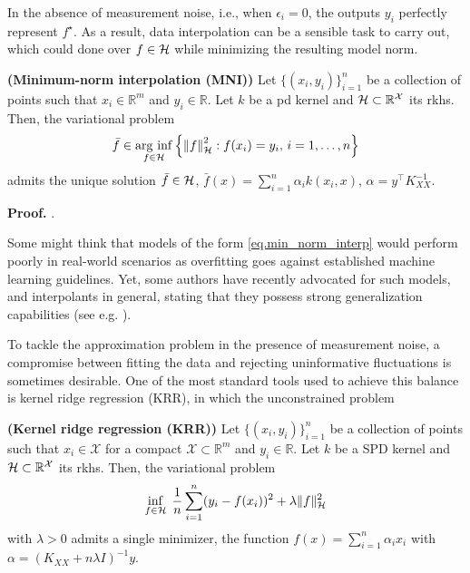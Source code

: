 In the absence of measurement noise, i.e., when $\epsilon_i = 0$, the outputs $y_i$ perfectly represent $f^\star$. As a result, data interpolation can be a sensible task to carry out, which could done over $f \in \mathcal{H}$ while minimizing the resulting model norm.
\begin{proposition}
	\label{prop.MNI}
	\textbf{(Minimum-norm interpolation (MNI))}
	Let $\{(x_i,y_i)\}_{i=1}^n$ be a collection of points such that $x_i \in \mathbb{R}^m$ and $y_i \in \mathbb{R}$. Let $k$ be a \ac{pd} kernel and $\mathcal{H} \subset \mathbb{R}^\mathcal{X}$ its \ac{rkhs}. Then, the variational problem
	\begin{equation}
		\label{eq.min_norm_interp}
			\bar{f} \in \operatorname*{\arg\,\inf}_{f \in \mathcal{H}} \left\{ \left\| f \right\|_\mathcal{H}^2 : f(x_i) = y_i, \, i = 1,\dots,n \right\}
	\end{equation}
	admits the unique solution $\bar f \in \mathcal{H}$, $\bar f(x) =  \sum_{i=1}^n \alpha_i k(x_i,x)$, $\alpha = y^\top K_{XX}^{-1}$.
\end{proposition}
\begin{my_proof}
	\textbf{Proof.}
	\cite[Theorem~3.5]{kanagawa2018gaussian}.
\end{my_proof}

\begin{remark}
	Some might think that models of the form \eqref{eq.min_norm_interp} would perform poorly in real-world scenarios as overfitting goes against established machine learning guidelines. Yet, some authors have recently advocated for such models, and interpolants in general, stating that they possess strong generalization capabilities (see e.g. \cite{belkin2018understand,belkin2019reconciling,beaglehole2022kernel}).
\end{remark}

To tackle the approximation problem in the presence of measurement noise, a compromise between fitting the data and rejecting uninformative fluctuations is sometimes desirable. One of the most standard tools used to achieve this balance is kernel ridge regression (KRR), in which the unconstrained problem

\begin{proposition}
	\textbf{(Kernel ridge regression (KRR))}
	Let $\{(x_i,y_i)\}_{i=1}^n$ be a collection of points such that $x_i \in \mathcal{X}$ for a compact $\mathcal{X} \subset \mathbb{R}^m$ and $y_i \in \mathbb{R}$. Let $k$ be a SPD kernel and $\mathcal{H} \subset \mathbb{R}^\mathcal{X}$ its \ac{rkhs}. Then, the variational problem
	\begin{equation}
		\inf_{f\in \mathcal{H}} \; \frac{1}{n} \sum_{i=1}^n (y_i - f(x_i))^2 + \lambda \Vert f \Vert_{\mathcal{H}}^2
		\label{eq.krr_model}
	\end{equation}
	with $\lambda > 0$ admits a single minimizer, the function $f(x) = \sum_{i=1}^n \alpha_i x_i$ with $\alpha = (K_{XX} + n \lambda I)^{-1} y$. 
\end{proposition}


